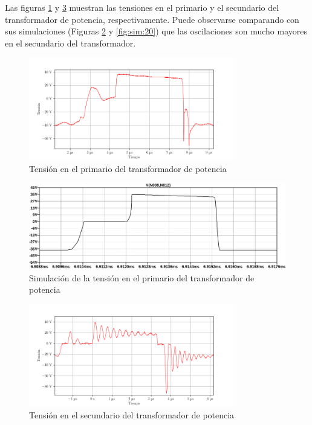 Las figuras \ref{fig:osc:38} y \ref{fig:osc:40} muestran las tensiones en el primario y el secundario del transformador de potencia, respectivamente. Puede observarse comparando con sus simulaciones (Figuras \ref{fig:sim:19} y \ref{fig:sim:20}) que las oscilaciones son mucho mayores en el secundario del transformador.

\begin{figure}[H]
    \centering
    \includegraphics[width=0.8\textwidth]{images/capturas-osciloscopio/17-11-2022/55.png}
    \caption{Tensión en el primario del transformador de potencia}
    \label{fig:osc:38}
\end{figure}

\begin{figure}[H]
    \centering
    \includegraphics[width=\textwidth]{images/sim/19.pdf}
    \caption{Simulación de la tensión en el primario del transformador de potencia}
    \label{fig:sim:19}
\end{figure}

\begin{figure}[H]
    \centering
    \includegraphics[width=0.8\textwidth]{images/capturas-osciloscopio/17-11-2022/40.png}
    \caption{Tensión en el secundario del transformador de potencia}
    \label{fig:osc:40}
\end{figure}

